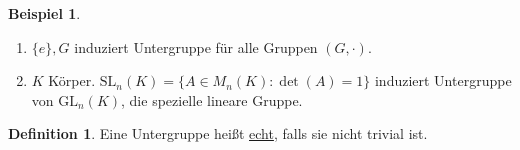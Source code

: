 \documentclass[fleqn, 12pt]{scrartcl}
\theoremstyle{definition}
\newtheorem*{defn}{Definition}
\newtheorem{ex}{Beispiel}
\theoremstyle{remark}
\newcommand{\gl}{\text{GL}}
\begin{document}
\begin{ex}
    \begin{enumerate}
        \item \(\{e\}, G\) induziert Untergruppe für alle Gruppen \((G,\cdot)\).
        \item \(K\) Körper. \(\text{SL}_n(K)=\{A\in M_n(K): \det(A)=1\}\) induziert Untergruppe von \(\gl_n(K)\), die spezielle lineare Gruppe.
    \end{enumerate}
\end{ex}

\begin{defn}
    Eine Untergruppe heißt \underline{echt}, falls sie nicht trivial ist.
\end{defn}
\end{document}
